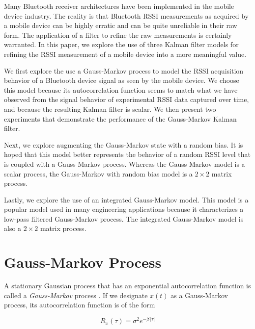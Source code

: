 \documentclass[12pt]{article}
\begin{document}
Many Bluetooth receiver architectures have been implemented in the mobile device industry.
The reality is that Bluetooth RSSI measurements as acquired by a mobile device can be
highly erratic and can be quite unreliable in their raw form. The application of a filter
to refine the raw measurements is certainly warranted. In this paper, we explore the use
of three Kalman filter models for refining the RSSI measurement of a mobile device into a
more meaningful value.

We first explore the use a Gauss-Markov process to model the RSSI acquisition behavior of
a Bluetooth device signal as seen by the mobile device. We choose this model because its
autocorrelation function seems to match what we have observed from the signal behavior of
experimental RSSI data captured over time, and because the resulting Kalman filter is
scalar. We then present two experiments that demonstrate the performance of the
Gauss-Markov Kalman filter.

Next, we explore augmenting the Gauss-Markov state with a random bias. It is hoped that
this model better represents the behavior of a random RSSI level that is coupled with
a Gauss-Markov process. Whereas the Gauss-Markov model is a scalar process, the Gauss-Markov
with random bias model is a $2 \times 2$ matrix process.

Lastly, we explore the use of an integrated Gauss-Markov model. This model is a popular
model used in many engineering applications because it characterizes a low-pass filtered
Gauss-Markov process. The integrated Gauss-Markov model is also a $2 \times 2$ matrix
process.



%
%

\clearpage
\section{Gauss-Markov Process}

A stationary Gaussian process that has an exponential autocorrelation function is called
a \emph{Gauss-Markov} process \cite{rgbrown1983}. If we designate $x(t)$ as a Gauss-Markov
process, its autocorrelation function is of the form

\begin{equation}
    R_x(\tau) = \sigma^2 e^{-\beta \, \lvert \tau \rvert}
    \label{eq:GM-autocorrelation}
\end{equation}
\end{document}
